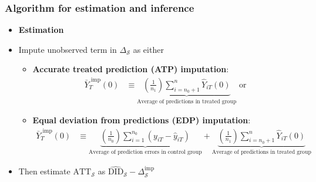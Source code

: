 \documentclass[table, xcolor = {dvipsnames}, 9pt]{beamer}
\theoremstyle{plain}
\DeclareMathOperator{\E}{\rm{E}}
\DeclareMathOperator{\Var}{\rm{Var}}
\begin{document}
\begin{frame}[t]
\frametitle{Algorithm for estimation and inference}
\vfill
\begin{itemize}
\item[] \textbf{Estimation} \vfill
\item \pause Impute unobserved term in $\Delta_{\mathcal{S}}$ as either \vfill
\begin{itemize}
\item \pause \textbf{Accurate treated prediction (ATP) imputation}: \vfill
\pause
\begin{align*}
\bar{Y}^{\text{ imp}}_{T}(0) & \equiv \underbrace{\left(\frac{1}{n_1}\right) \sum \limits_{i = n_0 + 1}^{n} \hat{Y}_{iT}(0)}_{\text{Average of predictions in treated group}} \text{ or }
\end{align*}
\vfill
\item \pause \textbf{Equal deviation from predictions (EDP) imputation}: \vfill
\pause
\begin{align*}
\bar{Y}^{\text{ imp}}_{T}(0) & \equiv \underbrace{\left(\frac{1}{n_0}\right)\sum \limits_{i = 1}^{n_0} \left(y_{iT} - \hat{y}_{iT}\right)}_{\text{Average of prediction errors in control group}} + \underbrace{\left(\frac{1}{n_1}\right) \sum \limits_{i = n_0 + 1}^{n} \hat{Y}_{iT}(0)}_{\text{Average of predictions in treated group}}
\end{align*} \vfill
\end{itemize} \vfill
\item \pause Then estimate $\text{ATT}_{\mathcal{S}}$ as $\widehat{\text{DID}}_{\mathcal{S}} - \Delta^{\text{imp}}_{\mathcal{S}}$ \vfill
\end{itemize}
\vfill
\end{frame}
\end{document}
